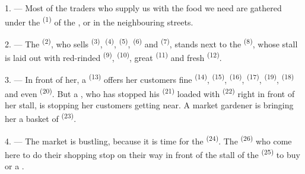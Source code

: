 
\VUsaut{4.0mm}
\VUsaut{3.0mm}

\VUsaut{3.0mm}

1. --- Most of the traders who supply us with the food we need are gathered under the
 \textsuperscript{(1)} of the , or in the neighbouring
streets.

2. --- The  \textsuperscript{(2)}, who sells 
\textsuperscript{(3)},  \textsuperscript{(4)}, 
\textsuperscript{(5)},  \textsuperscript{(6)} and 
\textsuperscript{(7)}, stands next to the 
\textsuperscript{(8)}, whose stall is laid out with red-rinded
 \textsuperscript{(9)},  \textsuperscript{(10)}, great
 \textsuperscript{(11)} and fresh 
\textsuperscript{(12)}.

3. --- In front of her, a  \textsuperscript{(13)} offers her
customers fine  \textsuperscript{(14)}, 
\textsuperscript{(15)},  \textsuperscript{(16)}, 
\textsuperscript{(17)},
 \textsuperscript{(19)},  \textsuperscript{(18)} and even
 \textsuperscript{(20)}. But a , who has stopped
his  \textsuperscript{(21)} loaded with 
\textsuperscript{(22)} right in front of her stall, is stopping her customers getting near. A
market gardener is bringing her a basket of
 \textsuperscript{(23)}.

\VUsaut{4.0mm}
\VUsaut{3.0mm}

4. --- The market is bustling, because it is time for the
 \textsuperscript{(24)}. The  \textsuperscript{(26)} who
come here to do their shopping stop on their way in front of the stall of the
 \textsuperscript{(25)} to buy  or a
.

